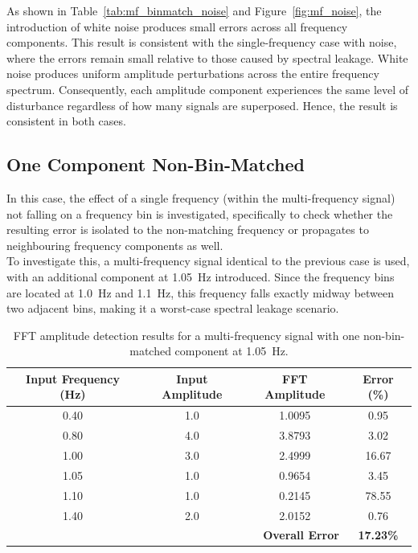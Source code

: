 \documentclass[../main]{subfiles}
\begin{document}
As shown in Table~\ref{tab:mf_binmatch_noise} and Figure~\ref{fig:mf_noise}, the introduction
of white noise produces small errors across all frequency components. This result is consistent
with the single-frequency case with noise, where the errors remain small relative to those caused by spectral
leakage. White noise produces uniform amplitude perturbations across the entire frequency spectrum.
Consequently, each amplitude component experiences the same level of disturbance regardless of how many signals 
are superposed. Hence, the result is consistent in both cases.

\subsection{One Component Non-Bin-Matched}

In this case, the effect of a single frequency (within the multi-frequency signal) not falling on a frequency bin is
investigated, specifically to check whether the
resulting error is isolated to the non-matching frequency or propagates to
neighbouring frequency components as well.\\

To investigate this, a multi-frequency signal identical to the previous case is used, with an
additional component at 1.05~Hz introduced. Since the frequency bins are located at 1.0~Hz
and 1.1~Hz, this frequency falls exactly midway between two adjacent bins, making it a
worst-case spectral leakage scenario.

\begin{table}[htbp]
\centering
\caption{FFT amplitude detection results for a multi-frequency signal with one non-bin-matched component at 1.05~Hz.}
\label{tab:mf_nonbinmatch}
\begin{tabular}{|c|c|c|c|}
\hline
\textbf{Input Frequency (Hz)} & \textbf{Input Amplitude} & \textbf{FFT Amplitude} & \textbf{Error (\%)} \\
\hline
0.40  & 1.0 & 1.0095 &  0.95 \\
\hline
0.80  & 4.0 & 3.8793 &  3.02 \\
\hline
1.00  & 3.0 & 2.4999 & 16.67 \\
\hline
1.05  & 1.0 & 0.9654 &  3.45 \\
\hline
1.10  & 1.0 & 0.2145 & 78.55 \\
\hline
1.40  & 2.0 & 2.0152 &  0.76 \\
\hline
\multicolumn{3}{|r|}{\textbf{Overall Error}} & \textbf{17.23\%} \\
\hline
\end{tabular}
\end{table}
\end{document}
